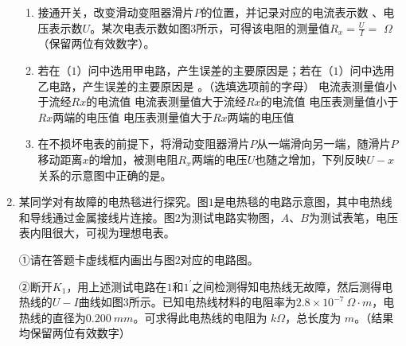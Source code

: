 \begin{enumerate}[leftmargin=0em]
\begin{enumerate}
\item 
接通开关，改变滑动变阻器滑片$ P $的位置，并记录对应的电流表示数  、电压表示数$ U $。某次电表示数如图$ 3 $所示，可得该电阻的测量值$R _ { x } = \frac { U } { I } = $  $ \Omega $（保留两位有效数字）。
\begin{figure}[h!]
\centering

\end{figure}

\item 
若在（$ 1 $）问中选用甲电路，产生误差的主要原因是；若在（$ 1 $）问中选用乙电路，产生误差的主要原因是  。（选填选项前的字母）
\fourchoices
{电流表测量值小于流经$ Rx $的电流值}
{电流表测量值大于流经$ Rx $的电流值}
{电压表测量值小于$ Rx $两端的电压值}
{电压表测量值大于$ Rx $两端的电压值}

\item 
在不损坏电表的前提下，将滑动变阻器滑片$ P $从一端滑向另一端，随滑片$ P $移动距离$ x $的增加，被测电阻$ R_x $两端的电压$ U $也随之增加，下列反映$ U-x $关系的示意图中正确的是。
\begin{figure}[h!]
\centering

\end{figure}




\end{enumerate}








\newpage
\item 
{}
某同学对有故障的电热毯进行探究。图$ 1 $是电热毯的电路示意图，其中电热线和导线通过金属接线片连接。图$ 2 $为测试电路实物图，$ A $、$ B $为测试表笔，电压表内阻很大，可视为理想电表。
\begin{figure}[h!]
\centering

\end{figure}

①请在答题卡虚线框内画出与图$ 2 $对应的电路图。

②断开$ K_{1} $，用上述测试电路在$ 1 $和$ 1 ^{\prime} $之间检测得知电热线无故障，然后测得电热线的$ U-I $曲线如图$ 3 $所示。已知电热线材料的电阻率为$ 2.8 \times 10^{-7 }\ \Omega \cdot m $，电热线的直径为$ 0.200 \ mm $。可求得此电热线的电阻为  $ k \Omega $，总长度为  $ m $。（结果均保留两位有效数字）
\begin{figure}[h!]
\centering

\end{figure}



\end{enumerate}
